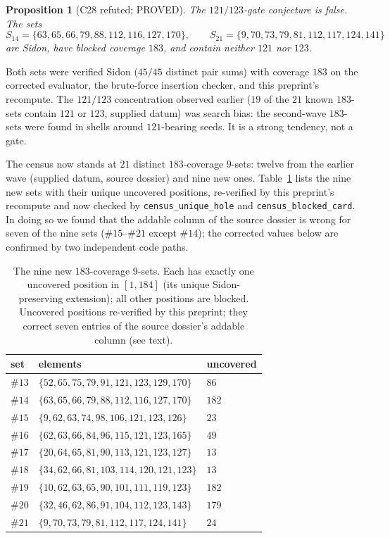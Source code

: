 \documentclass[11pt,a4paper]{article}
\newtheorem{proposition}{Proposition}
\theoremstyle{definition}
\begin{document}
\begin{proposition}[C28 refuted; PROVED]
  \label{prop:c28}
  The $121/123$-gate conjecture is false. The sets
  \begin{equation}
    \label{eq:c28a}
    S_{14}=\{63,65,66,79,88,112,116,127,170\},\qquad
    S_{21}=\{9,70,73,79,81,112,117,124,141\}
  \end{equation}
  are Sidon, have blocked coverage $183$, and contain neither $121$
  nor $123$.
\end{proposition}

Both sets were verified Sidon ($45/45$ distinct pair sums) with coverage
$183$ on the corrected evaluator, the brute-force insertion checker, and
this preprint's recompute. The $121/123$ concentration observed earlier
($19$ of the $21$ known $183$-sets contain $121$ or $123$, supplied
datum) was search bias: the second-wave $183$-sets were found in shells
around $121$-bearing seeds. It is a strong tendency, not a gate.

The census now stands at $21$ distinct $183$-coverage $9$-sets: twelve
from the earlier wave (supplied datum, source dossier) and nine new
ones. Table~\ref{tab:census} lists the nine new sets with their unique
uncovered positions, re-verified by this preprint's recompute and now checked by
\texttt{census\_unique\_hole} and \texttt{census\_blocked\_card}. In doing
so we found that the addable column of the source dossier is wrong for
seven of the nine sets ($\#15$--$\#21$ except $\#14$); the corrected
values below are confirmed by two independent code paths.

\begin{table}[t]
  \centering
  \caption{The nine new $183$-coverage $9$-sets. Each has exactly one
    uncovered position in $[1,184]$ (its unique Sidon-preserving
    extension); all other positions are blocked. Uncovered positions
    re-verified by this preprint; they correct seven entries of the
    source dossier's addable column (see text).}
  \label{tab:census}
  \begin{tabular}{lll}
    \toprule
    set & elements & uncovered \\
    \midrule
    $\#13$ & $\{52,65,75,79,91,121,123,129,170\}$ & $86$ \\
    $\#14$ & $\{63,65,66,79,88,112,116,127,170\}$ & $182$ \\
    $\#15$ & $\{9,62,63,74,98,106,121,123,126\}$ & $23$ \\
    $\#16$ & $\{62,63,66,84,96,115,121,123,165\}$ & $49$ \\
    $\#17$ & $\{20,64,65,81,90,113,121,123,127\}$ & $13$ \\
    $\#18$ & $\{34,62,66,81,103,114,120,121,123\}$ & $13$ \\
    $\#19$ & $\{10,62,63,65,90,101,111,119,123\}$ & $182$ \\
    $\#20$ & $\{32,46,62,86,91,104,112,123,143\}$ & $179$ \\
    $\#21$ & $\{9,70,73,79,81,112,117,124,141\}$ & $24$ \\
    \bottomrule
  \end{tabular}
\end{table}
\end{document}
